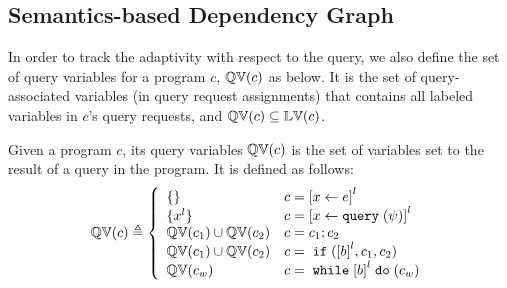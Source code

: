 \subsection{Semantics-based Dependency Graph}
\label{sec:design_choice}
In order to track the adaptivity with respect to the query,
we also define the set of query variables for a program $c$, $\mathbb{QV}(c)$ as below.
It is the set of query-associated variables (in query request assignments) that contains all labeled variables in $c$'s query requests, and $\mathbb{QV}(c) \subseteq \mathbb{LV}(c)$.
\begin{defn} 
 \label{def:qvar}
Given a program $c$, its query variables 
$\mathbb{QV}(c)$ is the set of variables set to the result of a query in the program.
It is defined as follows:
{
\[
 \qvar(c) \triangleq
 \left\{
 \begin{array}{ll}
 \{\} 
 & {c} = \clabel{\assign x \expr}^{l} 
 \\
 \{{x}^l\} 
 & {c} = \clabel{\assign x \query(\qexpr)}^{l} 
 \\
 \qvar(c_1) \cup \qvar(c_2) 
 & {c} = {c_1};{c_2}
 \\
 \qvar(c_1) \cup \qvar(c_2) 
 & {c} =\eif(\clabel{\bexpr}^{l}, c_1, c_2) 
 \\
 \qvar(c_w)
 & {c} = \ewhile \clabel{\bexpr}^{l} \edo (c_w)
\end{array}
\right.
\]
}
\end{defn}

